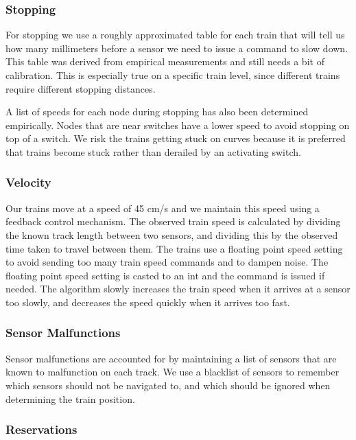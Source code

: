 \documentclass[letterpaper]{article}
\begin{document}
\subsubsection{Stopping%
  \label{stopping}%
}

For stopping we use a roughly approximated table for each train that will tell us how many millimeters before a sensor we need to issue a command to slow down.  This table was derived from empirical measurements and still needs a bit of calibration.  This is especially true on a specific train level, since different trains require different stopping distances.

A list of speeds for each node during stopping has also been determined empirically. Nodes that are near switches have a lower speed to avoid stopping on top of a switch. We risk the trains getting stuck on curves because it is preferred that trains become stuck rather than derailed by an activating switch.


\subsubsection{Velocity%
  \label{velocity}%
}

Our trains move at a speed of 45 cm/s and we maintain this speed using a feedback control mechanism. The observed train speed is calculated by dividing the known track length between two sensors, and dividing this by the observed time taken to travel between them.  The trains use a floating point speed setting to avoid sending too many train speed commands and to dampen noise. The floating point speed setting is casted to an int and the command is issued if needed. The algorithm slowly increases the train speed when it arrives at a sensor too slowly, and decreases the speed quickly when it arrives too fast.


\subsubsection{Sensor Malfunctions%
  \label{sensor-malfunctions}%
}

Sensor malfunctions are accounted for by maintaining a list of sensors that are known to malfunction on each track.  We use a blacklist of sensors to remember which sensors should not be navigated to, and which should be ignored when determining the train position.


\subsubsection{Reservations%
  \label{reservations}%
}
\end{document}
